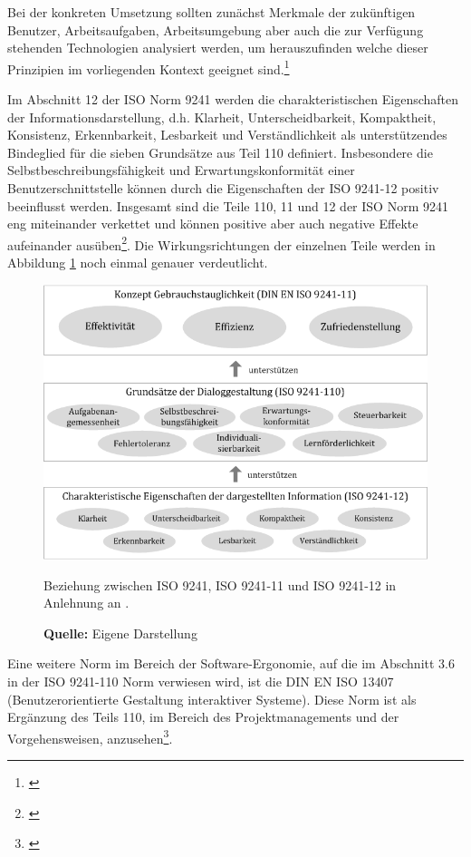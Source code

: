 Bei der konkreten Umsetzung sollten zunächst Merkmale der zukünftigen Benutzer, Arbeitsaufgaben, Arbeitsumgebung aber auch die zur Verfügung stehenden Technologien analysiert werden, um herauszufinden welche dieser Prinzipien im vorliegenden Kontext geeignet sind.\footnote{\cite[vgl.][]{Figl2010}}

Im Abschnitt 12 der ISO Norm 9241 werden die charakteristischen Eigenschaften der Informationsdarstellung, d.h. Klarheit, Unterscheidbarkeit, Kompaktheit, Konsistenz, Erkennbarkeit, Lesbarkeit und Verständlichkeit als unterstützendes Bindeglied für die sieben Grundsätze aus Teil 110 definiert. Insbesondere die Selbstbeschreibungsfähigkeit und Erwartungskonformität einer Benutzerschnittstelle können durch die Eigenschaften der ISO 9241-12 positiv beeinflusst werden. Insgesamt sind die Teile 110, 11 und 12 der ISO Norm 9241 eng miteinander verkettet und können positive aber auch negative Effekte aufeinander ausüben\footnote{\cite[vgl.][Kap. 6]{ISO9241-110}}. Die Wirkungsrichtungen der einzelnen Teile werden in Abbildung \ref{fig:beziehungIsoNormen} noch einmal genauer verdeutlicht.
\begin{figure}[H]
  \centering
  \includegraphics[scale=0.80]{img/Beziehung_ISO9241_ISO9241-11_ISO9241-12.png}
  \caption{Beziehung zwischen ISO 9241, ISO 9241-11 und ISO 9241-12 in Anlehnung an \citep[]{ISO9241-110}.}
  \caption*{\textbf{Quelle:} Eigene Darstellung}
  \label{fig:beziehungIsoNormen}
\end{figure}
Eine weitere Norm im Bereich der Software-Ergonomie, auf die im Abschnitt 3.6 in der ISO 9241-110 Norm verwiesen wird, ist die DIN EN ISO 13407 (Benutzerorientierte Gestaltung interaktiver Systeme). Diese Norm ist als Ergänzung des Teils 110, im Bereich des Projektmanagements und der Vorgehensweisen, anzusehen\footnote{\cite[vgl.][58]{Schneider2008}}.

